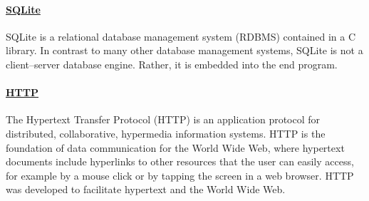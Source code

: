 \documentclass[10pt]{article}
\begin{document}
\paragraph{\underline{SQLite}} SQLite is a relational database management system (RDBMS) contained in a C library. In contrast to many other database management systems, SQLite is not a client–server database engine. Rather, it is embedded into the end program.

\paragraph{\underline{HTTP}} The Hypertext Transfer Protocol (HTTP) is an application protocol for distributed, collaborative, hypermedia information systems. HTTP is the foundation of data communication for the World Wide Web, where hypertext documents include hyperlinks to other resources that the user can easily access, for example by a mouse click or by tapping the screen in a web browser. HTTP was developed to facilitate hypertext and the World Wide Web.

\end{document}
